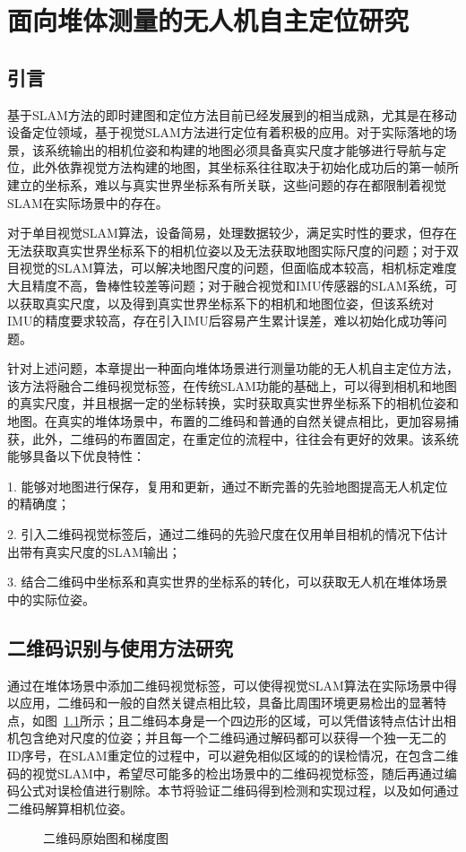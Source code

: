 \chapter{面向堆体测量的无人机自主定位研究}
\label{cha:chap2}
\section{引言}
\label{sec:2.1}
基于SLAM方法的即时建图和定位方法目前已经发展到的相当成熟，尤其是在移动设备定位领域，基于视觉SLAM方法进行定位有着积极的应用。对于实际落地的场景，该系统输出的相机位姿和构建的地图必须具备真实尺度才能够进行导航与定位，此外依靠视觉方法构建的地图，其坐标系往往取决于初始化成功后的第一帧所建立的坐标系，难以与真实世界坐标系有所关联，这些问题的存在都限制着视觉SLAM在实际场景中的存在。

对于单目视觉SLAM算法，设备简易，处理数据较少，满足实时性的要求，但存在无法获取真实世界坐标系下的相机位姿以及无法获取地图实际尺度的问题；对于双目视觉的SLAM算法，可以解决地图尺度的问题，但面临成本较高，相机标定难度大且精度不高，鲁棒性较差等问题；对于融合视觉和IMU传感器的SLAM系统，可以获取真实尺度，以及得到真实世界坐标系下的相机和地图位姿，但该系统对IMU的精度要求较高，存在引入IMU后容易产生累计误差，难以初始化成功等问题。

针对上述问题，本章提出一种面向堆体场景进行测量功能的无人机自主定位方法，该方法将融合二维码视觉标签，在传统SLAM功能的基础上，可以得到相机和地图的真实尺度，并且根据一定的坐标转换，实时获取真实世界坐标系下的相机位姿和地图。在真实的堆体场景中，布置的二维码和普通的自然关键点相比，更加容易捕获，此外，二维码的布置固定，在重定位的流程中，往往会有更好的效果。该系统能够具备以下优良特性：

1. 能够对地图进行保存，复用和更新，通过不断完善的先验地图提高无人机定位的精确度；

2. 引入二维码视觉标签后，通过二维码的先验尺度在仅用单目相机的情况下估计出带有真实尺度的SLAM输出；

3. 结合二维码中坐标系和真实世界的坐标系的转化，可以获取无人机在堆体场景中的实际位姿。
\section{二维码识别与使用方法研究}
\label{sec:2.2}
通过在堆体场景中添加二维码视觉标签，可以使得视觉SLAM算法在实际场景中得以应用，二维码和一般的自然关键点相比较，具备比周围环境更易检出的显著特点，如图~\ref{fig:2VSLAM_MarkerandGradient}所示；且二维码本身是一个四边形的区域，可以凭借该特点估计出相机包含绝对尺度的位姿；并且每一个二维码通过解码都可以获得一个独一无二的ID序号，在SLAM重定位的过程中，可以避免相似区域的的误检情况，在包含二维码的视觉SLAM中，希望尽可能多的检出场景中的二维码视觉标签，随后再通过编码公式对误检值进行剔除。本节将验证二维码得到检测和实现过程，以及如何通过二维码解算相机位姿。
\begin{figure}[H]
  \centering%
  \hspace{1em}%
  \caption{二维码原始图和梯度图}
  \label{fig:2VSLAM_MarkerandGradient}
\end{figure}
